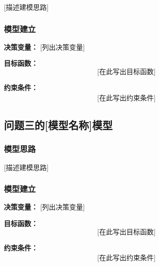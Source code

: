 [描述建模思路]

\subsubsection{模型建立}

\textbf{决策变量：} [列出决策变量]

\textbf{目标函数：}
\begin{equation}\label{eq:obj2}
    \text{[在此写出目标函数]}
\end{equation}

\textbf{约束条件：}
\begin{align}
    \text{[在此写出约束条件]} \label{eq:con2_1}
\end{align}

\subsection{问题三的[模型名称]模型}

\subsubsection{模型思路}

[描述建模思路]

\subsubsection{模型建立}

\textbf{决策变量：} [列出决策变量]

\textbf{目标函数：}
\begin{equation}\label{eq:obj3}
    \text{[在此写出目标函数]}
\end{equation}

\textbf{约束条件：}
\begin{align}
    \text{[在此写出约束条件]} \label{eq:con3_1}
\end{align}

